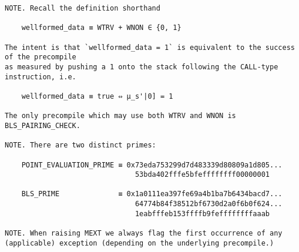 \documentclass[varwidth=\maxdimen,margin=0.5cm,multi={verbatim}]{standalone}
\begin{document}
\begin{verbatim}
NOTE. Recall the definition shorthand

    wellformed_data ≡ WTRV + WNON ∈ {0, 1}

The intent is that `wellformed_data = 1` is equivalent to the success of the precompile
as measured by pushing a 1 onto the stack following the CALL-type instruction, i.e.

    wellformed_data ≡ true ⇔ μ_s'|0] = 1

The only precompile which may use both WTRV and WNON is BLS_PAIRING_CHECK.

NOTE. There are two distinct primes:

    POINT_EVALUATION_PRIME ≡ 0x73eda753299d7d483339d80809a1d805...
                               53bda402fffe5bfeffffffff00000001

    BLS_PRIME              ≡ 0x1a0111ea397fe69a4b1ba7b6434bacd7...
                               64774b84f38512bf6730d2a0f6b0f624...
                               1eabfffeb153ffffb9feffffffffaaab

NOTE. When raising MEXT we always flag the first occurrence of any (applicable) exception (depending on the underlying precompile.)

\end{verbatim}
\end{document}
